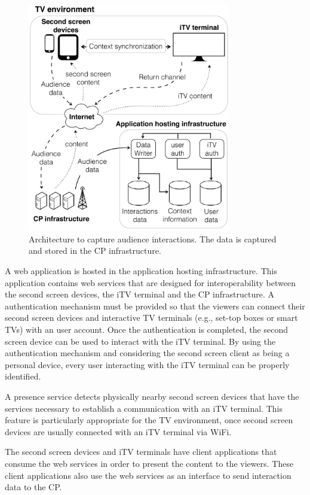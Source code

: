 \documentclass[journal]{IEEEtran}
\begin{document}
\begin{figure}[!t]
	\centering
	\includegraphics[width=3.5in]{img/architecture-overview.pdf}
	\caption{Architecture to capture audience interactions. The data is captured and stored in the CP infrastructure.}
	\label{fig_architecture}
\end{figure}

A web application is hosted in the application hosting infrastructure. This application contains web services that are designed for interoperability between the second screen devices, the iTV terminal and the CP infrastructure. A authentication mechanism must be provided so that the viewers can connect their second screen devices and interactive TV terminals (e.g., set-top boxes or smart TVs) with an user account. Once the authentication is completed, the second screen device can be used to interact with the iTV terminal. By using the authentication mechanism and considering the second screen client as being a personal device, every user interacting with the iTV terminal can be properly identified.

A presence service detects physically nearby second screen devices that have the services necessary to establish a communication with an iTV terminal. This feature is particularly appropriate for the TV environment, once second screen devices are usually connected with an iTV terminal via WiFi.

The second screen devices and iTV terminals have client applications that consume the web services in order to present the content to the viewers. These client applications also use the web services as an interface to send interaction data to the CP. 
\end{document}
